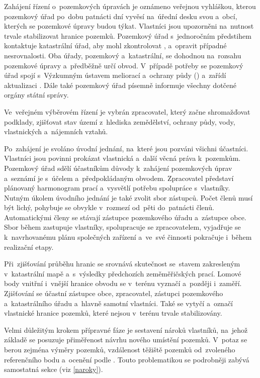 Zahájení řízení o~pozemkových úpravách je oznámeno veřejnou vyhláškou,
kterou pozemkový úřad po~dobu patnácti dní vyvěsí na~úřední desku svou
a~obcí, kterých se pozemkové úpravy budou týkat. Vlastníci jsou
upozorněni na~nutnost trvale stabilizovat hranice pozemků. Pozemkový
úřad s~jednoročním předstihem kontaktuje katastrální úřad, aby mohl
zkontrolovat ,  a~opravit případné nesrovnalosti. Oba
úřady, pozemkový a~katastrální, se dohodnou na~rozsahu pozemkové
úpravy a~předběžně určí obvod. V~případě potřeby se pozemkový úřad
spojí s~Výzkumným ústavem meliorací a~ochrany půdy ()
a~zařídí aktualizaci . Dále také pozemkový úřad písemně
informuje všechny dotčené orgány státní správy.

Ve~veřejném výběrovém řízení je vybrán zpracovatel, který začne
shromažďovat podklady, zjišťovat stav území z~hlediska zemědělství,
ochrany půdy, vody, vlastnických a~nájemních vztahů.

Po~zahájení  je svoláno úvodní jednání, na~které jsou pozváni
všichni účastníci. Vlastníci jsou povinni prokázat vlastnická a~další
věcná práva k~pozemkům. Pozemkový úřad sdělí účastníkům důvody
k~zahájení pozemkových úprav a~seznámí je s~účelem a~předpokládaným
obvodem. Zpracovatel představí plánovaný harmonogram prací a~vysvětlí
potřebu spolupráce s~vlastníky. Nutným úkolem úvodního jednání je také
zvolit sbor zástupců. Počet členů musí být lichý, pohybuje se obvykle
v~rozmezí od~pěti do~patnácti členů. Automatickými členy se stávají
zástupce pozemkového úřadu a~zástupce obce. Sbor během 
zastupuje vlastníky, spolupracuje se zpracovatelem, vyjadřuje se
k~navrhovanému plánu společných zařízení a~ve~své činnosti pokračuje
i~během realizační etapy.

Při~zjišťování průběhu hranic se srovnává skutečnost se~stavem
zakresleným v~katastrální mapě a~s~výsledky předchozích zeměměřičských
prací. Lomové body vnitřní i~vnější hranice obvodu se v~terénu vyznačí
a~později i~zaměří. Zjišťování se účastní zástupce obce, zpracovatel,
zástupci pozemkového a~katastrálního úřadu a~hlavně samotní
vlastníci. Také se vytyčí a~označí vlastnické hranice pozemků, které
nejsou v~terénu trvale stabilizovány.

Velmi důležitým krokem přípravné fáze je sestavení nároků vlastníků,
na~jehož základě se posuzuje přiměřenost návrhu nového umístění
pozemků. V~potaz se berou zejména výměry pozemků, vzdálenost těžiště
pozemků od~zvoleného referenčního bodu a~ocenění podle
. Touto problematikou se podrobněji zabývá samostatná sekce
(viz \ref{naroky}).

